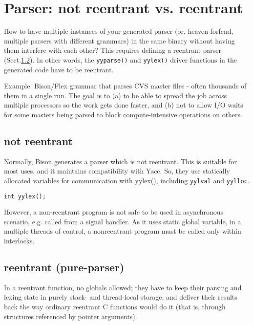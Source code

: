     

\section{Parser: not reentrant vs. reentrant}

How to have multiple instances of your generated parser (or, heaven forfend,
multiple parsers with different grammars) in the same binary without having them
interfere with each other? This requires defining a reentrant parser
(Sect.\ref{sec:reentrant-parser}).
In other words, 
the \verb!yyparse()! and \verb!yylex()! driver functions in the generated code
have to be reentrant. 

Example: Bison/Flex grammar that parses CVS master files  -  often thousands of
them in a single run. The goal is to (a) to be able to spread the job across
multiple processors so the work gets done faster, and (b) not to allow I/O waits
for some masters being parsed to block compute-intensive operations on others. 



\subsection{not reentrant}
\label{sec:not-reentrant-parser}
\label{sec:parser-not-reentrant}

Normally, Bison generates a parser which is not reentrant. This is suitable for
most uses, and it maintains compatibility with Yacc.
So, they use statically allocated variables for communication with yylex(),
including \verb!yylval! and \verb!yylloc!.
\begin{verbatim}
int yylex();
\end{verbatim}

However, a non-reentrant program is not safe to be used in asynchronous
scenario, e.g. called from a signal handler. As it uses static global variable, 
in a multiple threads of control, a nonreentrant program must be called only
within interlocks. 

\subsection{reentrant (pure-parser)}
\label{sec:reentrant-parser}
\label{sec:pure_parser-bison}

In a reentrant function, no globals allowed; they have to keep their parsing and
lexing state in purely stack- and thread-local storage, and deliver their
results back the way ordinary reentrant C functions would do it (that is,
through structures referenced by pointer arguments).

